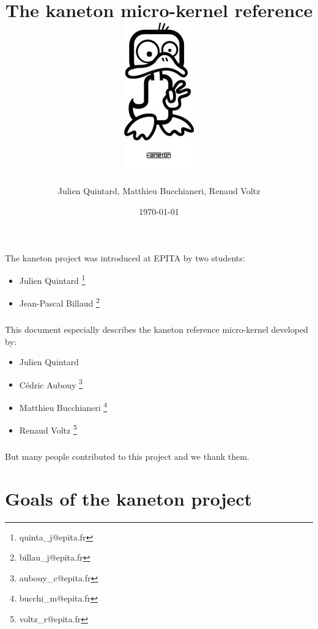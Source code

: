 \documentclass[12pt,a4wide]{report}
\date{\scriptsize{\today}}
\title{\huge{The kaneton micro-kernel reference}
\\\vspace{2cm}\includegraphics{logo.jpg}}
\author{\small{Julien Quintard}, \small{Matthieu Bucchianeri},
\small{Renaud Voltz}\vspace{2cm}}
\newcommand{\kaneton}{kaneton\xspace}
\begin{document}
%
%

\maketitle

%
%

%
%

\newpage

\paragraph{}
The \kaneton project was introduced at EPITA by two students:

\begin{itemize}
\item Julien Quintard \footnote{quinta\_j@epita.fr}
\item Jean-Pascal Billaud \footnote{billau\_j@epita.fr}
\end{itemize}

\paragraph{}
This document especially describes the kaneton reference micro-kernel
developed by:

\begin{itemize}
\item Julien Quintard
\item C\'edric Aubouy \footnote{aubouy\_c@epita.fr}
\item Matthieu Bucchianeri \footnote{bucchi\_m@epita.fr}
\item Renaud Voltz \footnote{voltz\_r@epita.fr}
\end{itemize}

\paragraph{}
But many people contributed to this project and we thank them.

%
%

\tableofcontents

%
%

\chapter{Goals of the \kaneton project}
\end{document}
